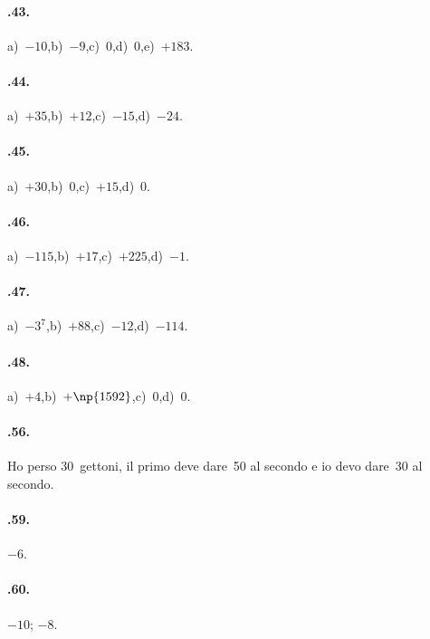 \paragraph{\thechapter.43.}
a)~$-10$,\quad b)~$-9$,\quad c)~$0$,\quad d)~$0$,\quad e)~$+183$.

\paragraph{\thechapter.44.}
a)~$+35$,\quad b)~$+12$,\quad c)~$-15$,\quad d)~$-24$.

\paragraph{\thechapter.45.}
a)~$+30$,\quad b)~$0$,\quad c)~$+15$,\quad d)~$0$.

\paragraph{\thechapter.46.}
a)~$-115$,\quad b)~$+17$,\quad c)~$+225$,\quad d)~$-1$.

\paragraph{\thechapter.47.}
a)~$-3^7$,\quad b)~$+88$,\quad c)~$-12$,\quad d)~$-114$.

\paragraph{\thechapter.48.}
a)~$+4$,\quad b)~$+\np{1592}$,\quad c)~$0$,\quad d)~$0$.

\paragraph{\thechapter.56.}
Ho perso 30~gettoni, il primo deve dare~50 al secondo e io devo dare~30 al secondo.

\paragraph{\thechapter.59.}
$-6$\textdegree.

\paragraph{\thechapter.60.}
$-10$; $-8$.
